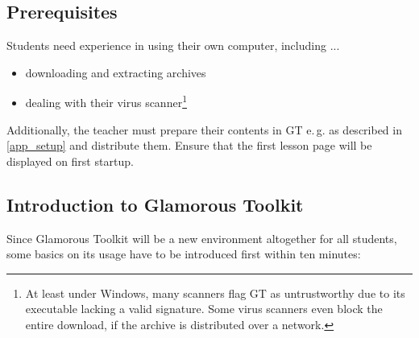 \subsection{Prerequisites}

Students need experience in using their own computer, including ...
\begin{itemize}
\item downloading and extracting archives
\item dealing with their virus scanner\footnote{At least under Windows, many scanners flag GT as untrustworthy due to its executable lacking a valid signature. Some virus scanners even block the entire download, if the archive is distributed over a network.}
\end{itemize}

Additionally, the teacher must prepare their contents in GT e.\,g. as described in \ref{app_setup} and distribute them. Ensure that the first lesson page will be displayed on first startup.


\subsection{Introduction to Glamorous Toolkit} \label{ssc_lesson_gt}

Since Glamorous Toolkit will be a new environment altogether for all students, some basics on its usage have to be introduced first within ten minutes:

